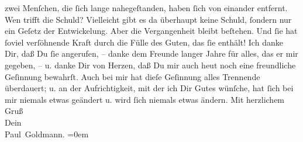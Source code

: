 \begin{ledgroupsized}[t]{13cm}
               zwei Menſchen, die ſich lange nahegeſtanden, haben ſich von einander entfernt. Wen
               trifft die Schuld? Vielleicht gibt es da überhaupt keine Schuld, ſondern nur ein
               Geſetz der Entwickelung.\pend
           \pstart
           Aber die Vergangenheit {\pb}bleibt beſtehen. Und ſie
               hat ſoviel verſöhnende Kraft durch die Fülle des Guten, das ſie enthält! Ich danke
               Dir, daß Du ſie angerufen, – danke dem Freunde langer Jahre für alles, das er mir
               gegeben, – u. danke Dir von Herzen, daß Du mir auch heut noch eine freundliche
               Geſinnung bewahrſt. Auch bei mir hat dieſe Geſinnung alles Trennende überdauert; {\pb}u. an der Aufrichtigkeit, mit der ich Dir Gutes
               wünſche, hat ſich bei mir niemals etwas geändert u. wird ſich niemals etwas
               ändern.\pend
           \pstart
           Mit herzlichem Gruß {\\[\baselineskip]}Dein {\\[\baselineskip]}\spacefill\mbox{Paul Goldmann.}\pend
           \leftskip=0em{}
         
         \endnumbering{}\end{ledgroupsized}  \newcommand{\dateiname}{L03477}\newcommand{\titel}{Paul Goldmann an Arthur Schnitzler, 10. 2. 1915}\newcommand{\editorInnen}{Martin Anton Müller und Laura Untner}
      